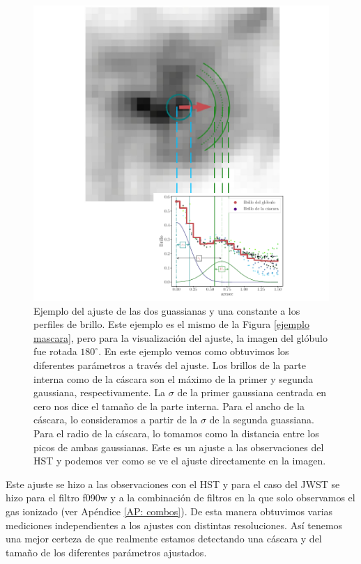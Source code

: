 \documentclass{book}
\begin{document}
\begin{figure}[htbp]
    \centering
    \includegraphics[width=\textwidth]{Nuevas imagenes finales/ejemplo_ajuste_2.pdf}
    \caption{Ejemplo del ajuste de las dos guassianas y una constante a los perfiles de brillo. Este ejemplo es el mismo de la Figura \ref{ejemplo mascara}, pero para la visualización del ajuste, la imagen del glóbulo fue rotada $180^\circ$. En este ejemplo vemos como obtuvimos los diferentes parámetros a través del ajuste. Los brillos de la parte interna como de la cáscara son el máximo de la primer y segunda gaussiana, respectivamente. La $\sigma$ de la primer gaussiana centrada en cero nos dice el tamaño de la parte interna. Para el ancho de la cáscara, lo consideramos a partir de la $\sigma$ de la segunda guassiana. Para el radio de la cáscara, lo tomamos como la distancia entre los picos de ambas gaussianas. Este es un ajuste a las observaciones del HST y podemos ver como se ve el ajuste directamente en la imagen.}
    \label{ejemplo ajuste}
\end{figure}

Este ajuste se hizo a las observaciones con el HST y para el caso del JWST se hizo para el filtro f090w  y a la combinación de filtros en la que solo observamos el gas ionizado (ver Apéndice \ref{AP: combos}). De esta manera obtuvimos varias mediciones independientes a los ajustes con distintas resoluciones. Así tenemos una mejor certeza de que realmente estamos detectando una cáscara y del tamaño de los diferentes parámetros ajustados.
\end{document}
